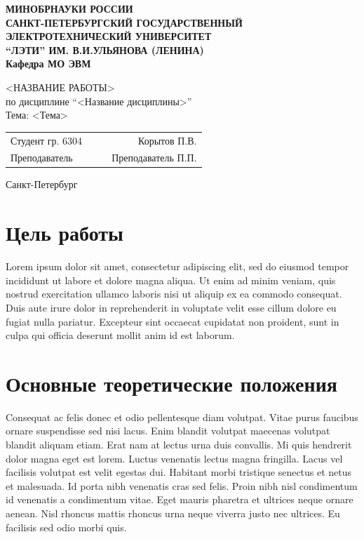 \documentclass[a4paper, 14pt]{extarticle}
\begin{document}
\begin{titlepage}
    \centering
    {\bfseries
        \uppercase{
            Минобрнауки России \\
            Санкт-Петербургский государственный \\
            Электротехнический университет \\
            \enquote{ЛЭТИ} им. В.И.Ульянова (Ленина)\\
        }
        Кафедра МО ЭВМ

        \vspace{\fill}
        \uppercase{<Название работы>} \\
        по дисциплине \enquote{<Название дисциплины>} \\
        Тема: <Тема>
    }

    \vspace{\fill}
    \begin{tabularx}{0.8\textwidth}{l X c r}
        Студент гр. 6304 & & \underline{\hspace{3cm}} & Корытов П.В.\\
        Преподаватель & & \underline{\hspace{3cm}} & Преподаватель П.П. 
    \end{tabularx}

    \vspace{1cm}
    Санкт-Петербург \\
    \the\year{}
\end{titlepage}

\section*{Цель работы}
Lorem ipsum dolor sit amet, consectetur adipiscing elit, sed do eiusmod tempor incididunt ut labore et dolore magna aliqua. Ut enim ad minim veniam, quis nostrud exercitation ullamco laboris nisi ut aliquip ex ea commodo consequat. Duis aute irure dolor in reprehenderit in voluptate velit esse cillum dolore eu fugiat nulla pariatur. Excepteur sint occaecat cupidatat non proident, sunt in culpa qui officia deserunt mollit anim id est laborum.

\section*{Основные теоретические положения}
Consequat ac felis donec et odio pellentesque diam volutpat. Vitae purus faucibus ornare suspendisse sed nisi lacus. Enim blandit volutpat maecenas volutpat blandit aliquam etiam. Erat nam at lectus urna duis convallis. Mi quis hendrerit dolor magna eget est lorem. Luctus venenatis lectus magna fringilla. Lacus vel facilisis volutpat est velit egestas dui. Habitant morbi tristique senectus et netus et malesuada. Id porta nibh venenatis cras sed felis. Proin nibh nisl condimentum id venenatis a condimentum vitae. Eget mauris pharetra et ultrices neque ornare aenean. Nisl rhoncus mattis rhoncus urna neque viverra justo nec ultrices. Eu facilisis sed odio morbi quis.
\end{document}
